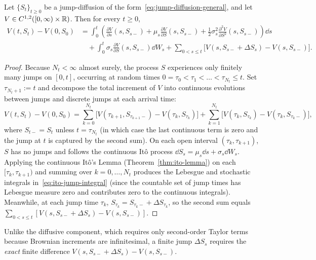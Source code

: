 \begin{theorem}
\label{thm:ito-jump-diffusion}
Let $\{S_t\}_{t \ge 0}$ be a jump-diffusion of the form~\eqref{eq:jump-diffusion-general}, and let $V \in C^{1,2}([0, \infty) \times \mathbb{R})$. Then for every $t \ge 0$,
\begin{align}
\label{eq:ito-jump-integral}
V(t, S_t) - V(0, S_0)
&= \int_0^t \left(\frac{\partial V}{\partial s}(s, S_{s-}) + \mu_s \frac{\partial V}{\partial S}(s, S_{s-}) + \frac{1}{2}\sigma_s^2 \frac{\partial^2 V}{\partial S^2}(s, S_{s-})\right)\dd s \nonumber \\
&\quad + \int_0^t \sigma_s \frac{\partial V}{\partial S}(s, S_{s-})\dd W_s + \sum_{0 < s \le t} \Big[V(s, S_{s-} + \Delta S_s) - V(s, S_{s-})\Big].
\end{align}
\end{theorem}

\begin{proof}
Because $N_t < \infty$ almost surely, the process $S$ experiences only finitely many jumps on $[0, t]$, occurring at random times $0 = \tau_0 < \tau_1 < \dots < \tau_{N_t} \le t$. Set $\tau_{N_t + 1} := t$ and decompose the total increment of $V$ into continuous evolutions between jumps and discrete jumps at each arrival time:
\[
V(t, S_t) - V(0, S_0) = \sum_{k=0}^{N_t} \Big[V(\tau_{k+1}, S_{\tau_{k+1}-}) - V(\tau_k, S_{\tau_k})\Big] + \sum_{k=1}^{N_t} \Big[V(\tau_k, S_{\tau_k}) - V(\tau_k, S_{\tau_k-})\Big],
\]
where $S_{t-} = S_t$ unless $t = \tau_{N_t}$ (in which case the last continuous term is zero and the jump at $t$ is captured by the second sum). On each open interval $(\tau_k, \tau_{k+1})$, $S$ has no jumps and follows the continuous It\^o process $\dd S_s = \mu_s \dd s + \sigma_s \dd W_s$. Applying the continuous It\^o's Lemma (Theorem~\ref{thm:ito-lemma}) on each $[\tau_k, \tau_{k+1})$ and summing over $k = 0, \dots, N_t$ produces the Lebesgue and stochastic integrals in~\eqref{eq:ito-jump-integral} (since the countable set of jump times has Lebesgue measure zero and contributes zero to the continuous integrals). Meanwhile, at each jump time $\tau_k$, $S_{\tau_k} = S_{\tau_k-} + \Delta S_{\tau_k}$, so the second sum equals $\sum_{0 < s \le t} [V(s, S_{s-} + \Delta S_s) - V(s, S_{s-})]$.
\end{proof}

Unlike the diffusive component, which requires only second-order Taylor terms because Brownian increments are infinitesimal, a finite jump $\Delta S_s$ requires the \emph{exact} finite difference $V(s, S_{s-} + \Delta S_s) - V(s, S_{s-})$.

